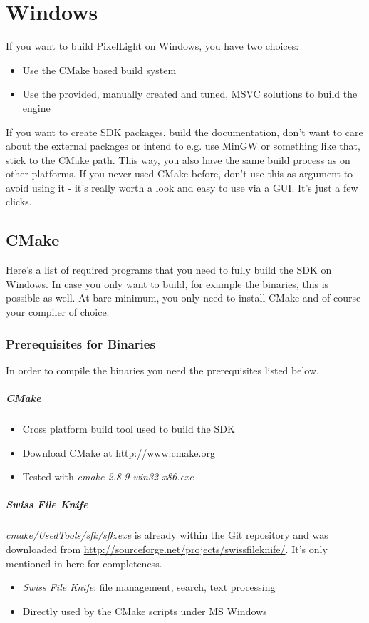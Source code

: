 \chapter{Windows}
If you want to build PixelLight on Windows, you have two choices:
\begin{itemize}
\item{Use the CMake based build system}
\item{Use the provided, manually created and tuned, \ac{MSVC} solutions to build the engine}
\end{itemize}

If you want to create \ac{SDK} packages, build the documentation, don't want to care about the external packages or intend to e.g. use MinGW or something like that, stick to the CMake path. This way, you also have the same build process as on other platforms. If you never used CMake before, don't use this as argument to avoid using it - it's really worth a look and easy to use via a \ac{GUI}. It's just a few clicks.




\section{CMake}
Here's a list of required programs that you need to fully build the \ac{SDK} on Windows. In case you only want to build, for example the binaries, this is possible as well. At bare minimum, you only need to install CMake and of course your compiler of choice.



\subsection{Prerequisites for Binaries}
In order to compile the binaries you need the prerequisites listed below.


\paragraph{CMake}
\begin{itemize}
\item{Cross platform build tool used to build the \ac{SDK}}
\item{Download CMake at \url{http://www.cmake.org}}
\item{Tested with \emph{cmake-2.8.9-win32-x86.exe}}
\end{itemize}


\paragraph{Swiss File Knife}
\emph{cmake/UsedTools/sfk/sfk.exe} is already within the Git repository and was downloaded from \url{http://sourceforge.net/projects/swissfileknife/}. It's only mentioned in here for completeness.
\begin{itemize}
\item{\emph{Swiss File Knife}: file management, search, text processing}
\item{Directly used by the CMake scripts under \ac{MS} Windows}
\end{itemize}


